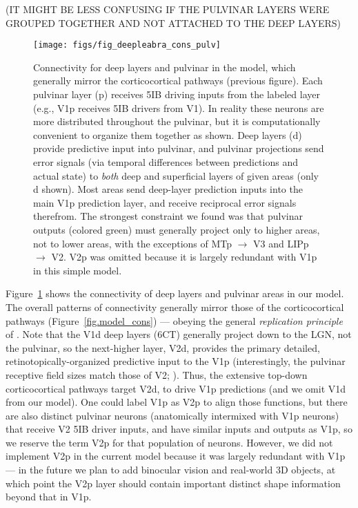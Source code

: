 \documentclass[11pt,twoside]{article}
\newif\myifpdf
\begin{document}
(IT MIGHT BE LESS CONFUSING IF THE PULVINAR LAYERS WERE GROUPED TOGETHER AND NOT ATTACHED TO THE DEEP LAYERS)

\begin{figure}
  \centering\texttt{[image: figs/fig\_deepleabra\_cons\_pulv]}
  \caption{\footnotesize Connectivity for deep layers and pulvinar in the model, which generally mirror the corticocortical pathways (previous figure).  Each pulvinar layer (p) receives 5IB driving inputs from the labeled layer (e.g., V1p receives 5IB drivers from V1).  In reality these neurons are more distributed throughout the pulvinar, but it is computationally convenient to organize them together as shown.  Deep layers (d) provide predictive input into pulvinar, and pulvinar projections send error signals (via temporal differences between predictions and actual state) to {\em both} deep and superficial layers of given areas (only d shown).  Most areas send deep-layer prediction inputs into the main V1p prediction layer, and receive reciprocal error signals therefrom.  The strongest constraint we found was that pulvinar outputs (colored green) must generally project only to higher areas, not to lower areas, with the exceptions of MTp $\rightarrow$ V3 and LIPp $\rightarrow$ V2.  V2p was omitted because it is largely redundant with V1p in this simple model.}
  \label{fig.model_cons_pulv}
\end{figure}

Figure~\ref{fig.model_cons_pulv} shows the connectivity of deep layers and pulvinar areas in our model.  The overall patterns of connectivity generally mirror those of the corticocortical pathways (Figure~\ref{fig.model_cons}) --- obeying the general {\em replication principle} of .  Note that the V1d deep layers (6CT) generally project down to the LGN, not the pulvinar, so the next-higher layer, V2d, provides the primary detailed, retinotopically-organized predictive input to the V1p (interestingly, the pulvinar receptive field sizes match those of V2; ).  Thus, the extensive top-down corticocortical pathways target V2d, to drive V1p predictions (and we omit V1d from our model).  One could label V1p as V2p to align those functions, but there are also distinct pulvinar neurons (anatomically intermixed with V1p neurons) that receive V2 5IB driver inputs, and have similar inputs and outputs as V1p, so we reserve the term V2p for that population of neurons.  However, we did not implement V2p in the current model because it was largely redundant with V1p --- in the future we plan to add binocular vision and real-world 3D objects, at which point the V2p layer should contain important distinct shape information beyond that in V1p.
\end{document}
